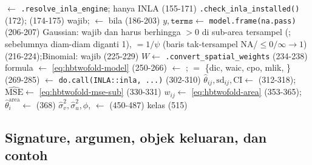 \begin{algorithm}[htbp]
\caption{\texttt{hb\_twofold} --- alur sebenarnya (\texttt{R/hb\_twofold.R:136-520})}
\label{alg:hbtwofold}
 $\leftarrow$ \texttt{.resolve\_inla\_engine}; hanya INLA (155-171)\;
\texttt{.check\_inla\_installed()} (172);\quad {} (174-175)\;
 wajib;\quad {} $\leftarrow$  bila  (186-203)\;
$y,\texttt{terms}\leftarrow$ \texttt{model.frame(na.pass)} (206-207)\;
Gaussian:  wajib dan harus berhingga $>0$ di sub-area tersampel (; sebelumnya diam-diam diganti 1),  $=1/\psi$ (baris tak-tersampel NA/$\le0/\infty
  \to1$) (216-224);\quad Binomial:  wajib (225-229)\;
$W\leftarrow$ \texttt{.convert\_spatial\_weights} (234-238)\;
formula $\leftarrow$ \eqref{eq:hbtwofold-model} (250-266)\;
 $\leftarrow$ ;\quad {}
  $=$ \{dic, waic, cpo, mlik, \} (269-285)\;
 $\leftarrow$ \texttt{do.call(INLA::inla, ...)} (302-310)\;
$\hat\theta_{ij},\mathrm{sd}_{ij},\mathrm{CI}\leftarrow$ (312-318);
  $\widehat{\mathrm{MSE}}\leftarrow$ \eqref{eq:hbtwofold-mse-sub} (330-331)\;
$w_{ij}\leftarrow$ \eqref{eq:hbtwofold-area} (353-365);\quad
  $\hat\theta^{\text{area}}_i\leftarrow$ (368)\;
\;
$\hat\sigma_v^2,\hat\sigma_u^2,\phi$,  $\leftarrow$ (450-487)\;
kelas  (515)\;
\end{algorithm}

\subsection{Signature, argumen, objek keluaran, dan contoh}\label{sec:hbtwofold-api}

